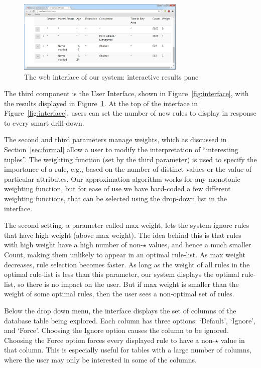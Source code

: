\begin{figure}[ht]
\vspace{-5pt}
\centering
\includegraphics[width=80mm,frame]{graphs/uiresults.jpg}
\vspace{-5pt}
\caption{The web interface of our system: interactive results pane \label{fig:results}}
\vspace{-5pt}
\end{figure}

 The third component is the User Interface, 
shown in Figure~\ref{fig:interface}, with the results displayed in Figure~\ref{fig:results}.
At the top of the interface in Figure~\ref{fig:interface}, users can set the number 
of new rules to display in response to every smart drill-down. 

The second and third parameters manage weights, which as discussed in Section~\ref{sec:formal} allow a user to modify the interpretation of ``interesting tuples''.
The weighting function (set by the third parameter) is used to specify the importance of a rule, e.g., based on the number of distinct values or the value of particular attributes. Our approximation algorithm works for any monotonic weighting function, 
but for ease of use we have hard-coded a few different weighting functions, that can be selected using the drop-down list in the interface.

The second setting, a parameter called max weight, lets the system ignore rules that have high weight (above max weight). The idea behind this is that rules with high weight have a high number of non-$\star$ values, and hence a much smaller Count, making them unlikely to appear in an optimal rule-list. As max weight decreases, rule selection becomes faster. As long as the weight of all rules in the optimal rule-list is less than this
parameter, our system displays the optimal rule-list, so there is no impact on the user. But if max weight is smaller than the weight of some optimal rules, then the user sees a non-optimal set of rules.

Below the drop down menu, the interface displays the set of columns of the database table being explored. Each column has three options: `Default', `Ignore', and `Force'. Choosing the Ignore option causes the column to be ignored. Choosing the Force option forces every displayed rule to have a non-$\star$ value in that column. This is especially useful for tables with a large number of columns, where the user may only be interested in some of the columns. 

